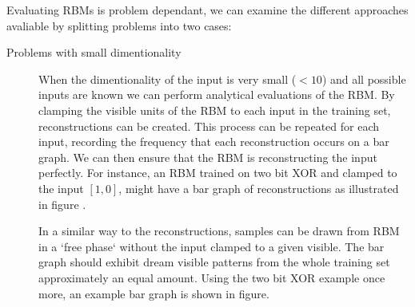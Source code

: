   Evaluating RBMs is problem dependant, we can examine the different approaches avaliable by splitting problems into two cases:
  \begin{description}
  \item[Problems with small dimentionality] When the dimentionality of the input is very small ($<10$) and all possible inputs are known we can perform analytical evaluations of the RBM. By clamping the visible units of the RBM to each input in the training set, reconstructions can be created. This process can be repeated for each input, recording the frequency that each reconstruction occurs on a bar graph. We can then ensure that the RBM is reconstructing the input perfectly. For instance, an RBM trained on two bit XOR and clamped to the input $[1,0]$, might have a bar graph of reconstructions as illustrated in figure \todocite{\ref{F:Two-Bit-RBM-Recons}}.

  In a similar way to the reconstructions, samples can be drawn from RBM in a `free phase` without the input clamped to a given visible. The bar graph should exhibit dream visible patterns from the whole training set approximately an equal amount. Using the two bit XOR example once more, an example bar graph is shown in figure\todocite{\ref{F:XOR-ORBM}}.



\end{description}
